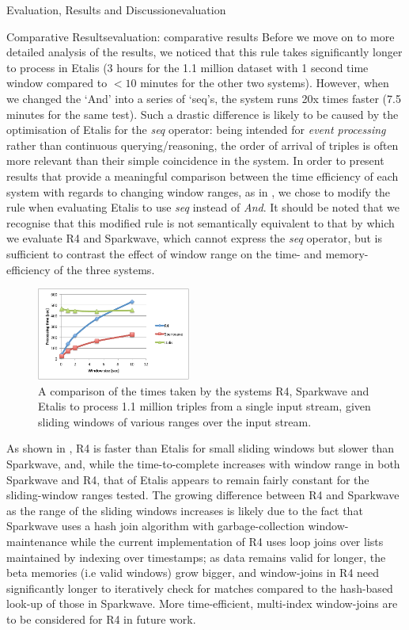 \begin{nestedsection}{Evaluation, Results and Discussion}{evaluation}
\begin{nestedsection}{Comparative Results}{evaluation: comparative results}
		Before we move on to more detailed analysis of the results, we noticed that this rule takes significantly longer to process in Etalis (3 hours for the 1.1 million dataset with 1 second time window compared to ${<10}$ minutes for the other two systems).
		However, when we changed the `And' into a series of `seq's, the system runs 20x times faster (7.5 minutes for the same test).
		Such a drastic difference is likely to be caused by the optimisation of Etalis for the \emph{seq} operator: being intended for \emph{event processing} rather than continuous querying/reasoning, the order of arrival of triples is often more relevant than their simple coincidence in the system.
		In order to present results that provide a meaningful comparison between the time efficiency of each system with regards to changing window ranges, as in , we chose to modify the rule when evaluating Etalis to use \emph{seq} instead of \emph{And}.
		It should be noted that we recognise that this modified rule is not semantically equivalent to that by which we evaluate R4 and Sparkwave, which cannot express the \emph{seq} operator, but is sufficient to contrast the effect of window range on the time- and memory-efficiency of the three systems.
		\begin{figure}
			\centering
			\includegraphics[width=0.45\textwidth]{all-systems-varying-windows}
			\caption{A comparison of the times taken by the systems R4, Sparkwave and Etalis to process 1.1 million triples from a single input stream, given sliding windows of various ranges over the input stream.}
		\end{figure}

		As shown in , R4 is faster than Etalis for small sliding windows but slower than Sparkwave, and, while the time-to-complete increases with window range in both Sparkwave and R4, that of Etalis appears to remain fairly constant for the sliding-window ranges tested.
		The growing difference between R4 and Sparkwave as the range of the sliding windows increases is likely due to the fact that Sparkwave uses a hash join algorithm with garbage-collection window-maintenance while the current implementation of R4 uses loop joins over lists maintained by indexing over timestamps;
		as data remains valid for longer, the beta memories (i.e valid windows) grow bigger, and window-joins in R4 need significantly longer to iteratively check for matches compared to the hash-based look-up of those in Sparkwave.
		More time-efficient, multi-index window-joins are to be considered for R4 in future work.


\end{nestedsection}
\end{nestedsection}
